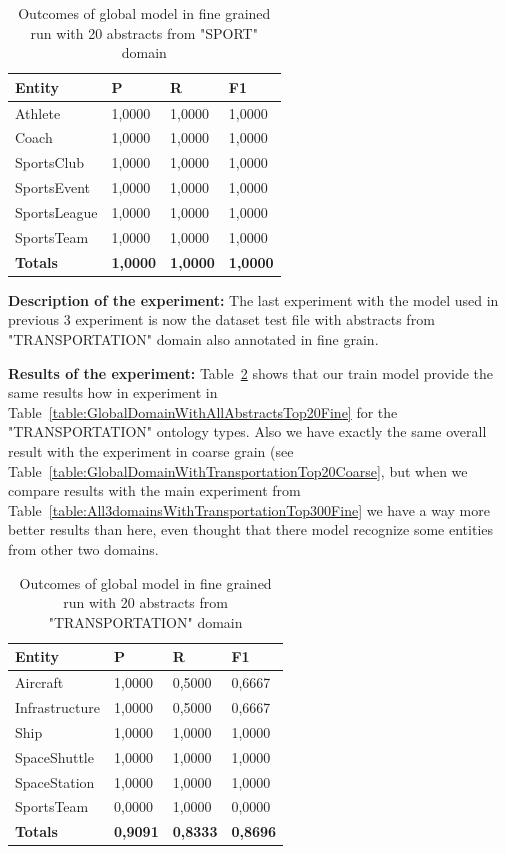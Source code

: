 \documentclass[thesis=M,english]{FITthesis}[2018/05/30]
\begin{document}
	\begin{table}[H]\centering
		\begin{tabular}{|l|l|l|l|}
			\hline {\textbf{Entity}} & {\textbf{P}} & {\textbf{R}} & {\textbf{F1}}\\\hline
				Athlete & 1,0000 & 1,0000 & 1,0000\\
				Coach & 1,0000 & 1,0000 & 1,0000\\
				SportsClub & 1,0000 & 1,0000 & 1,0000\\
				SportsEvent & 1,0000 & 1,0000 & 1,0000\\
				SportsLeague & 1,0000 & 1,0000 & 1,0000\\
				SportsTeam & 1,0000 & 1,0000 & 1,0000\\\hline
				\textbf{Totals} & \textbf{1,0000} & \textbf{1,0000} & \textbf{1,0000}\\\hline
		\end{tabular}
		\caption{Outcomes of global model in fine grained run with 20 abstracts from "SPORT" domain \label{table:GlobalDomainWithSportTop20Fine}}
	\end{table}	

\textbf{Description of the experiment:} The last experiment with the model used in previous 3 experiment is now the dataset test file with abstracts from "TRANSPORTATION" domain also annotated in fine grain.

\textbf{Results of the experiment:} Table~\ref{table:GlobalDomainWithTransportationTop20Fine} shows that our train model provide the same results how in experiment in Table~\ref{table:GlobalDomainWithAllAbstractsTop20Fine} for the "TRANSPORTATION" ontology types. Also we have exactly the same overall result with the experiment in coarse grain (see Table~\ref{table:GlobalDomainWithTransportationTop20Coarse}, but when we compare results with the main experiment from Table~\ref{table:All3domainsWithTransportationTop300Fine} we have a way more better results than here, even thought that there model recognize some entities from other two domains.

	\begin{table}[H]\centering
		\begin{tabular}{|l|l|l|l|}
			\hline {\textbf{Entity}} & {\textbf{P}} & {\textbf{R}} & {\textbf{F1}}\\\hline
				Aircraft & 1,0000 & 0,5000 & 0,6667\\
				Infrastructure & 1,0000 & 0,5000 & 0,6667\\
				Ship & 1,0000 & 1,0000 & 1,0000\\				
				SpaceShuttle & 1,0000 & 1,0000 & 1,0000\\
				SpaceStation & 1,0000 & 1,0000 & 1,0000\\
				SportsTeam & 0,0000 & 1,0000 & 0,0000\\\hline
				\textbf{Totals} & \textbf{0,9091} & \textbf{0,8333} & \textbf{0,8696}\\\hline
		\end{tabular}
		\caption{Outcomes of global model in fine grained run with 20 abstracts from "TRANSPORTATION" domain \label{table:GlobalDomainWithTransportationTop20Fine}}		
	\end{table}
\end{document}
